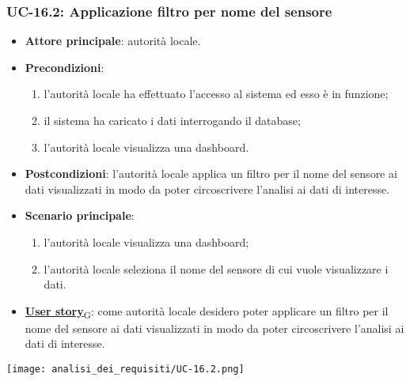 \subsubsection{UC-16.2: Applicazione filtro per nome del sensore}
\begin{itemize}
	\item \textbf{Attore principale}: autorità locale.
	\item \textbf{Precondizioni}:
	      \begin{enumerate}
		      \item l'autorità locale ha effettuato l'accesso al sistema ed esso è in funzione;
		      \item il sistema ha caricato i dati interrogando il database;
		      \item l'autorità locale visualizza una dashboard.
	      \end{enumerate}
	\item \textbf{Postcondizioni}: l'autorità locale applica un filtro per il nome del sensore ai dati visualizzati in modo da poter circoscrivere l'analisi ai dati di interesse.
	\item \textbf{Scenario principale}:
	      \begin{enumerate}
		      \item l'autorità locale visualizza una dashboard;
		      \item l'autorità locale seleziona il nome del sensore di cui vuole visualizzare i dati.
	      \end{enumerate}
	\item \href{https://7last.github.io/docs/pb/documentazione-interna/glossario\#user-story}{\textbf{User story}\textsubscript{G}}:
	      come autorità locale desidero poter applicare un filtro per il nome del sensore ai dati visualizzati in modo da poter circoscrivere l'analisi ai dati di interesse.
\end{itemize}
\begin{center}
	\texttt{[image: analisi\_dei\_requisiti/UC-16.2.png]}
\end{center}

